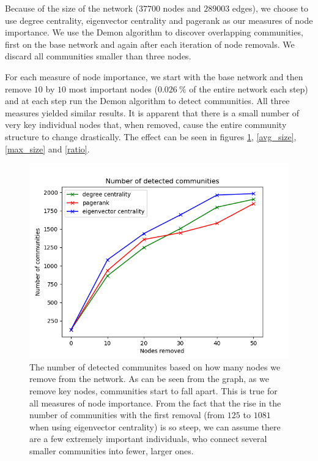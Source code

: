 \documentclass[9pt,twocolumn,twoside]{pnas-new}
\begin{document}

Because of the size of the network ($37700$ nodes and $289003$ edges), 
we choose to use degree centrality, eigenvector centrality and pagerank as our measures of node importance.
We use the Demon algorithm to discover overlapping communities, first on the base network and again after each iteration of node removals.
We discard all communities smaller than three nodes.

For each measure of node importance, we start with the base network and then remove $10$ by $10$ most important nodes ($0.026~\%$ of the entire network each step)
and at each step run the Demon algorithm to detect communities.
All three measures yielded similar results. 
It is apparent that there is a small number of very key individual nodes that, when removed, 
cause the entire community structure to change drastically.
The effect can be seen in figures \ref{num_coms}, \ref{avg_size}, \ref{max_size} and \ref{ratio}.

\begin{figure}[!htbp]
    \centering
    \includegraphics[width=0.9\linewidth]{num_coms.png}
    \caption{The number of detected communites based on how many nodes we remove from the network.
    As can be seen from the graph, as we remove key nodes, communities start to fall apart.
    This is true for all measures of node importance.
    From the fact that the rise in the number of communities with the first removal (from $125$ to $1081$ when using eigenvector centrality)
    is so steep, we can assume there are a few extremely important individuals, who connect several smaller communities into fewer, larger ones.}
    \label{num_coms}
\end{figure}
\end{document}
